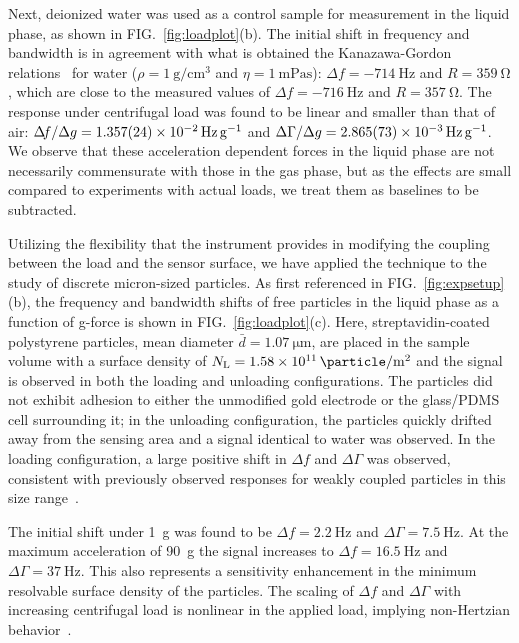 \documentclass[floatfix,superscriptaddress,a4paper,twocolumn]{revtex4-1}
\newcommand{\Figure}[1]{FIG.~\ref{#1}}
\newcommand{\df}{\Delta\!f}
\newcommand{\dg}{\Delta\Gamma}
\begin{document}
Next, deionized water was used as a control sample for measurement in the
liquid phase, as shown in \Figure{fig:loadplot}(b).  The initial shift in
frequency and bandwidth is in agreement with what is obtained the Kanazawa-Gordon
relations~\cite{kanazawa1985frequency} for water
($\rho=\SI{1}{\gram\per\centi\meter\cubed}$ and
$\eta=\SI{1}{\milli\pascal\second}$): $\df = \SI{-714}{\hertz}$ and
$R=\SI{359}{\ohm}$, which are close to the measured values of $\df =
  \SI{-716}{\hertz}$ and $R=\SI{357}{\ohm}$.  The response under centrifugal
load was found to be linear and smaller than that of air: $\df/\Delta g=
  \SI{1.357+-0.024e-2}{\hertz \per\g}$ and $\dg/\Delta g=
  \SI{2.865+-0.073e-3}{\hertz\per\g}$.  We observe that these acceleration
dependent forces in the liquid phase are not necessarily commensurate with
those in the gas phase, but as the effects are small compared to
experiments with actual loads, we treat them as baselines to be
subtracted.

Utilizing the flexibility that the instrument provides in modifying the
coupling between the load and the sensor surface, we have applied the
technique to the study of discrete micron-sized particles.  As first
referenced in \Figure{fig:expsetup}(b), the frequency and bandwidth shifts
of free particles in the liquid phase as a function of g-force is shown in
\Figure{fig:loadplot}(c).  Here, streptavidin-coated polystyrene particles,
mean diameter $\bar{d}=\SI{1.07}{\micro\meter}$, are placed in the sample volume with
a surface density of
$N_\mathrm{L}=\SI{1.58e11}{\particle\per\meter\squared}$ and the signal is
observed in both the loading and unloading configurations.
The particles
did not exhibit adhesion to either the unmodified gold electrode or the
glass/PDMS cell surrounding it; in the unloading configuration, the particles
quickly drifted away from the sensing area and a signal identical to water
was observed.  In the loading configuration, a large positive
shift in $\df$ and $\dg$ was observed, consistent with
previously observed responses for weakly coupled particles in this size
range~\cite{johannsman2007contacts}.

The initial shift under \SI{1}{g} was found to be $\df=
  \SI{2.2}{\hertz}$ and $\dg=\SI{7.5}{\hertz}$.  At the maximum acceleration of \SI{90}{g} the
signal increases to $\df = \SI{16.5}{\hertz}$ and $\dg=\SI{37}{\hertz}$. This also
represents a sensitivity enhancement in the minimum resolvable surface
density of the particles.  The scaling of $\df$ and $\dg$ with increasing
centrifugal load is nonlinear in the applied load, implying non-Hertzian
behavior~\cite{borovsky2001measuring}.
\end{document}
